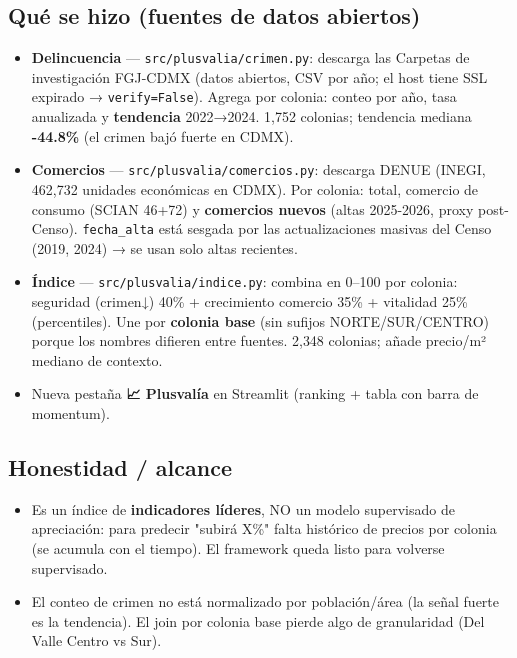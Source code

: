 \documentclass[11pt]{article}
\newcommand{\codigo}[1]{\texttt{#1}}
\begin{document}
\subsection*{Qué se hizo (fuentes de datos abiertos)}
\begin{itemize}
  \item \textbf{Delincuencia} — \codigo{src/plusvalia/crimen.py}: descarga las
        Carpetas de investigación FGJ-CDMX (datos abiertos, CSV por año; el host
        tiene SSL expirado → \codigo{verify=False}). Agrega por colonia: conteo
        por año, tasa anualizada y \textbf{tendencia} 2022→2024. 1{,}752 colonias;
        tendencia mediana \textbf{-44.8\%} (el crimen bajó fuerte en CDMX).
  \item \textbf{Comercios} — \codigo{src/plusvalia/comercios.py}: descarga DENUE
        (INEGI, 462{,}732 unidades económicas en CDMX). Por colonia: total,
        comercio de consumo (SCIAN 46+72) y \textbf{comercios nuevos} (altas
        2025-2026, proxy post-Censo). \codigo{fecha\_alta} está sesgada por las
        actualizaciones masivas del Censo (2019, 2024) → se usan solo altas recientes.
  \item \textbf{Índice} — \codigo{src/plusvalia/indice.py}: combina en 0–100 por
        colonia: seguridad (crimen↓) 40\% + crecimiento comercio 35\% + vitalidad
        25\% (percentiles). Une por \textbf{colonia base} (sin sufijos
        NORTE/SUR/CENTRO) porque los nombres difieren entre fuentes. 2{,}348
        colonias; añade precio/m² mediano de contexto.
  \item Nueva pestaña \textbf{📈 Plusvalía} en Streamlit (ranking + tabla con barra
        de momentum).
\end{itemize}

\subsection*{Honestidad / alcance}
\begin{itemize}
  \item Es un índice de \textbf{indicadores líderes}, NO un modelo supervisado de
        apreciación: para predecir "subirá X\%" falta histórico de precios por
        colonia (se acumula con el tiempo). El framework queda listo para
        volverse supervisado.
  \item El conteo de crimen no está normalizado por población/área (la señal
        fuerte es la tendencia). El join por colonia base pierde algo de
        granularidad (Del Valle Centro vs Sur).
\end{itemize}
\end{document}
